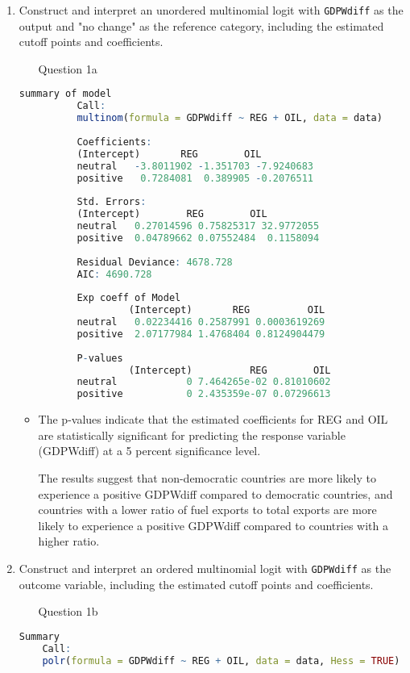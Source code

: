 \documentclass[12pt,letterpaper]{article}
\begin{document}
\begin{enumerate}
	\item Construct and interpret an unordered multinomial logit with \texttt{GDPWdiff} as the output and "no change" as the reference category, including the estimated cutoff points and coefficients.
	\begin{itemize}
		\item[Question 1a]
	  
	\end{itemize}
	 \begin{lstlisting}[language=R]	
	 	  summary of model
	 	  Call:
	 	  multinom(formula = GDPWdiff ~ REG + OIL, data = data)
	 	  
	 	  Coefficients:
	 	  (Intercept)       REG        OIL
	 	  neutral   -3.8011902 -1.351703 -7.9240683
	 	  positive   0.7284081  0.389905 -0.2076511
	 	  
	 	  Std. Errors:
	 	  (Intercept)        REG        OIL
	 	  neutral   0.27014596 0.75825317 32.9772055
	 	  positive  0.04789662 0.07552484  0.1158094
	 	  
	 	  Residual Deviance: 4678.728 
	 	  AIC: 4690.728 
	 	  
	 	  Exp coeff of Model
	 	           (Intercept)       REG          OIL
	 	  neutral   0.02234416 0.2587991 0.0003619269
	 	  positive  2.07177984 1.4768404 0.8124904479
	 	  
	 	  P-values
	 	           (Intercept)          REG        OIL
	 	  neutral            0 7.464265e-02 0.81010602
	 	  positive           0 2.435359e-07 0.07296613
	\end{lstlisting}
	\begin{itemize}
		\item  The p-values indicate that the estimated coefficients for REG and OIL are statistically significant for predicting the response variable (GDPWdiff) at a 5 percent  significance level.
	
	The results suggest that non-democratic countries are more likely to experience a positive GDPWdiff compared to democratic countries, and countries with a lower ratio of fuel exports to total exports are more likely to experience a positive GDPWdiff compared to countries with a higher ratio.
		\end{itemize}
	\item Construct and interpret an ordered multinomial logit with \texttt{GDPWdiff} as the outcome variable, including the estimated cutoff points and coefficients.
		\begin{itemize}
		\item[Question 1b]
		  
		\end{itemize}
	 \begin{lstlisting}[language=R]	
	Summary
	Call:
	polr(formula = GDPWdiff ~ REG + OIL, data = data, Hess = TRUE)
	

\end{lstlisting}
\end{enumerate}
\end{document}
